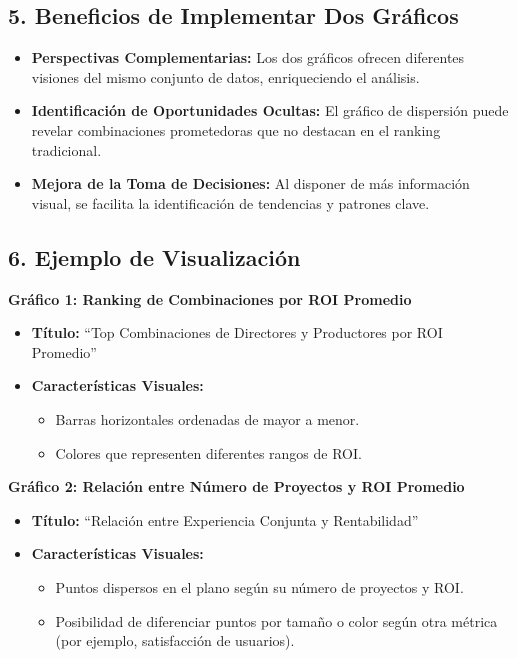 \documentclass[11pt]{opticajnl}
\begin{document}
\subsection{5. Beneficios de Implementar Dos Gráficos}

\begin{itemize}
    \item \textbf{Perspectivas Complementarias:} Los dos gráficos ofrecen diferentes visiones del mismo conjunto de datos, enriqueciendo el análisis.
    \item \textbf{Identificación de Oportunidades Ocultas:} El gráfico de dispersión puede revelar combinaciones prometedoras que no destacan en el ranking tradicional.
    \item \textbf{Mejora de la Toma de Decisiones:} Al disponer de más información visual, se facilita la identificación de tendencias y patrones clave.
\end{itemize}

\subsection{6. Ejemplo de Visualización}

\textbf{Gráfico 1: Ranking de Combinaciones por ROI Promedio}

\begin{itemize}
    \item \textbf{Título:} ``Top Combinaciones de Directores y Productores por ROI Promedio''
    \item \textbf{Características Visuales:}
    \begin{itemize}
        \item Barras horizontales ordenadas de mayor a menor.
        \item Colores que representen diferentes rangos de ROI.
    \end{itemize}
\end{itemize}

\textbf{Gráfico 2: Relación entre Número de Proyectos y ROI Promedio}

\begin{itemize}
    \item \textbf{Título:} ``Relación entre Experiencia Conjunta y Rentabilidad''
    \item \textbf{Características Visuales:}
    \begin{itemize}
        \item Puntos dispersos en el plano según su número de proyectos y ROI.
        \item Posibilidad de diferenciar puntos por tamaño o color según otra métrica (por ejemplo, satisfacción de usuarios).
    \end{itemize}
\end{itemize}
\end{document}
